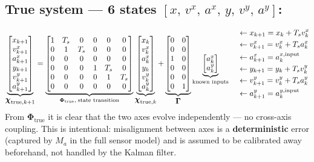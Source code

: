 \documentclass[12pt, a4paper]{article}
\begin{document}
\subsection*{True system --- 6 states $[x,\,v^x,\,a^x,\,y,\,v^y,\,a^y]$:}
\[
\underbrace{
\begin{bmatrix} x_{k+1} \\ v^x_{k+1} \\ a^x_{k+1} \\ y_{k+1} \\ v^y_{k+1} \\ a^y_{k+1} \end{bmatrix}
}_{\displaystyle\boldsymbol{\chi}_{\text{true},k+1}}
=
\underbrace{
\begin{bmatrix}
  1 & T_s & 0 & 0 & 0  & 0 \\
  0 & 1   & T_s & 0 & 0 & 0 \\
  0 & 0   & 0 & 0 & 0  & 0 \\
  0 & 0   & 0 & 1 & T_s & 0 \\
  0 & 0   & 0 & 0 & 1  & T_s \\
  0 & 0   & 0 & 0 & 0  & 0
\end{bmatrix}
}_{\boldsymbol{\Phi}_{\text{true}},\;{\scriptsize\text{state transition}}}
\underbrace{
\begin{bmatrix} x_k \\ v^x_k \\ a^x_k \\ y_k \\ v^y_k \\ a^y_k \end{bmatrix}
}_{\displaystyle\boldsymbol{\chi}_{\text{true},k}}
+
\underbrace{
\begin{bmatrix} 0 & 0 \\ 0 & 0 \\ 1 & 0 \\ 0 & 0 \\ 0 & 0 \\ 0 & 1 \end{bmatrix}
}_{\displaystyle\boldsymbol{\Gamma}}
\underbrace{
\begin{bmatrix} a^x_k \\ a^y_k \end{bmatrix}
}_{\scriptsize\text{known inputs}}
\quad
\begin{aligned}
  &\leftarrow x_{k+1}   = x_k + T_s v^x_k \\
  &\leftarrow v^x_{k+1} = v^x_k + T_s a^x_k \\
  &\leftarrow a^x_{k+1} = a^{x,\text{input}}_k \\
  &\leftarrow y_{k+1}   = y_k + T_s v^y_k \\
  &\leftarrow v^y_{k+1} = v^y_k + T_s a^y_k \\
  &\leftarrow a^y_{k+1} = a^{y,\text{input}}_k
\end{aligned}
\]
From $\boldsymbol{\Phi}_{\text{true}}$ it is clear that the two axes evolve independently ---
no cross-axis coupling. This is intentional: misalignment between axes is a
\textbf{deterministic} error (captured by $M_a$ in the full sensor model)
and is assumed to be calibrated away beforehand, not handled by the Kalman filter.
\end{document}
